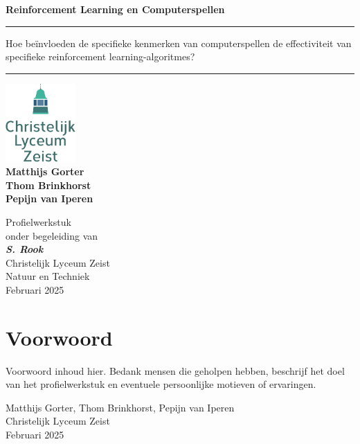\documentclass[a4paper,12pt]{report}
\begin{document}
\begin{titlepage}
    \centering
    \vspace*{1cm}
    \Huge\textbf{Reinforcement Learning en Computerspellen} \\
    \vspace{1cm}
    \rule{\linewidth}{0.4mm}
    \Large
    Hoe beïnvloeden de specifieke kenmerken van computerspellen de effectiviteit van specifieke reinforcement learning-algoritmes?
    \rule{\linewidth}{0.4mm}

    \vspace{1.5cm}
    \includegraphics[width=0.2\textwidth]{logo-clz.png} \\
    \vspace{1.5cm}
    \large
    \textbf{Matthijs Gorter} \\
    \textbf{Thom Brinkhorst} \\
    \textbf{Pepijn van Iperen} \\
    \vspace{\fill}
    \normalsize

    Profielwerkstuk \\ onder begeleiding van \\ \textit{\textbf{S. Rook}} \\
    Christelijk Lyceum Zeist \\ Natuur en Techniek \\ Februari 2025 \\ \newpage
\end{titlepage}

\chapter*{Voorwoord}
Voorwoord inhoud hier. Bedank mensen die geholpen hebben, beschrijf het doel van het profielwerkstuk en eventuele persoonlijke motieven of ervaringen.

\vspace{1cm}
\noindent
Matthijs Gorter, Thom Brinkhorst, Pepijn van Iperen \\
Christelijk Lyceum Zeist \\
Februari 2025
\end{document}
